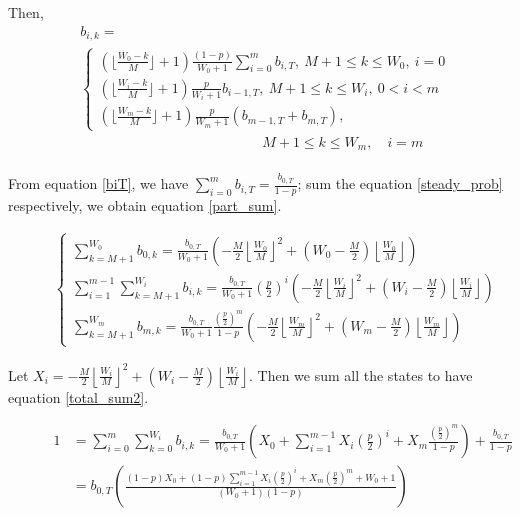 Then,
\begin{align}
&b_{i,k} =  \nonumber \\
&
\begin{cases}
(\lfloor \frac{W_0-k}{M} \rfloor+1)\frac{(1-p)}{W_0+1}\sum_{i=0}^m b_{i,T}, \  M+1\leq k\leq W_0,\ i = 0\\[3pt]
(\lfloor \frac{W_i-k}{M} \rfloor+1)\frac{p}{W_i+1}b_{i-1,T}, 				\	 M+1 \leq k\leq W_i, \ 0<i<m \\[3pt]
(\lfloor \frac{W_m-k}{M} \rfloor+1)\frac{p}{W_m+1} (b_{m-1,T}+b_{m,T}), 	
\end{cases}\nonumber
\\ &\qquad \qquad \qquad \qquad \quad \qquad \qquad M+1 \leq k\leq W_m, \quad i = m \nonumber \\
\label{steady_prob}
\end{align}

From equation \ref{biT}, we have $\sum_{i=0}^m b_{i,T}= \frac{b_{0,T}}{1-p}$; sum the equation \ref{steady_prob} respectively, we obtain equation \ref{part_sum}.  
\begin{figure}[!b]
\begin{align}
\begin{cases}
\sum_{k=M+1}^{W_0} b_{0,k} = \frac{b_{0,T}}{W_0+1}\left(-\frac{M}{2}\left\lfloor \frac{W_0}{M}\right\rfloor ^2 + \left(W_0-\frac{M}{2}\right)\left\lfloor \frac{W_0}{M} \right\rfloor \right) \\[8pt]
\sum_{i=1}^{m-1}\sum_{k=M+1}^{W_i} b_{i,k} = \frac{b_{0,T}}{W_0+1}\left(\frac{p}{2}\right)^i \left(-\frac{M}{2}\left\lfloor \frac{W_i}{M}\right\rfloor ^2 + \left(W_i-\frac{M}{2}\right)\left\lfloor \frac{W_i}{M} \right\rfloor \right) \\[8pt]
\sum_{k=M+1}^{W_m} b_{m,k} = \frac{b_{0,T}}{W_0+1}\frac{(\frac{p}{2})^m}{1-p}\left(-\frac{M}{2}\left\lfloor \frac{W_m}{M}\right\rfloor ^2 + \left(W_m-\frac{M}{2}\right)\left\lfloor \frac{W_m}{M} \right\rfloor \right) 
\end{cases}
\label{part_sum}
\end{align}
\end{figure}

Let $X_i = -\frac{M}{2}\left\lfloor \frac{W_i}{M}\right\rfloor ^2 + \left(W_i-\frac{M}{2}\right)\left\lfloor \frac{W_i}{M} \right\rfloor$. Then we sum all the states to have equation \ref{total_sum2}.
\begin{figure}[!b]
\begin{align}
1 &= \sum_{i=0}^m \sum_{k=0}^{W_i}b_{i,k} 
 = \frac{b_{0,T}}{W_0+1}\left( X_0 + \sum_{i=1}^{m-1}X_i\left( \frac{p}{2}\right)^i + X_m\frac{\left( \frac{p}{2}\right)^m}{1-p}\right) + \frac{b_{0,T}}{1-p}\label{total_sum}\\
& = b_{0,T}\left( \frac{(1-p)X_0+(1-p) \sum_{i=1}^{m-1}X_i\left( \frac{p}{2}\right)^i+X_m\left( \frac{p}{2}\right)^m+W_0+1}{(W_0+1)(1-p)}\right)\label{total_sum2}
\end{align}
\end{figure}

